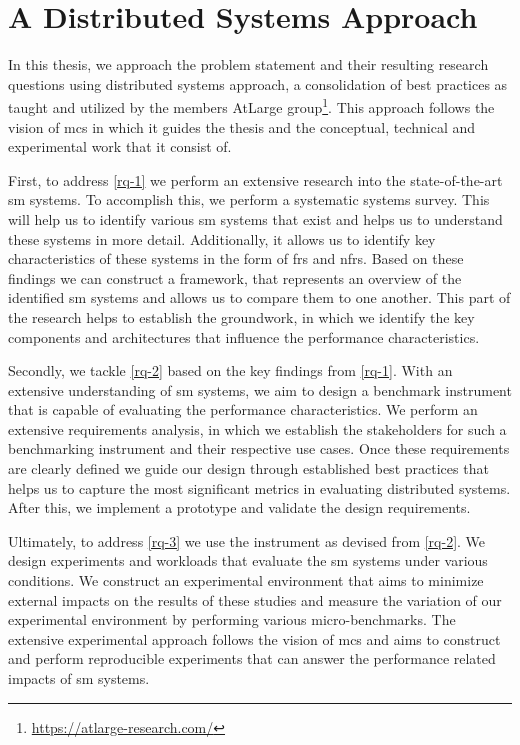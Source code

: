 \section{A Distributed Systems Approach}
\label{sec:approach}

In this thesis, we approach the problem statement and their resulting research questions using distributed systems approach, a consolidation of best practices as taught and utilized by the members AtLarge group\footnote{\url{https://atlarge-research.com/}}. This approach follows the vision of \gls{mcs} \cite{Iosup2018} in which it guides the thesis and the conceptual, technical and experimental work that it consist of.

First, to address \ref{rq-1} we perform an extensive research into the state-of-the-art \gls{sm} systems. To accomplish this, we perform a systematic systems survey. This will help us to identify various \gls{sm} systems that exist and helps us to understand these systems in more detail. Additionally, it allows us to identify key characteristics of these systems in the form of \glspl{fr} and \glspl{nfr}. Based on these findings we can construct a framework, that represents an overview of the identified \gls{sm} systems and allows us to compare them to one another. This part of the research helps to establish the groundwork, in which we identify the key components and architectures that influence the performance characteristics.

Secondly, we tackle \ref{rq-2} based on the key findings from \ref{rq-1}. With an extensive understanding of \gls{sm} systems, we aim to design a benchmark instrument that is capable of evaluating the performance characteristics. We perform an extensive requirements analysis, in which we establish the stakeholders for such a benchmarking instrument and their respective use cases. Once these requirements are clearly defined we guide our design through established best practices that helps us to capture the most significant metrics in evaluating distributed systems. After this, we implement a prototype and validate the design requirements.


Ultimately, to address \ref{rq-3} we use the instrument as devised from \ref{rq-2}. We design experiments and workloads that evaluate the \gls{sm} systems under various conditions. We construct an experimental environment that aims to minimize external impacts on the results of these studies and measure the variation of our experimental environment by performing various micro-benchmarks. The extensive experimental approach follows the vision of \gls{mcs} and aims to construct and perform reproducible experiments that can answer the performance related impacts of \gls{sm} systems.